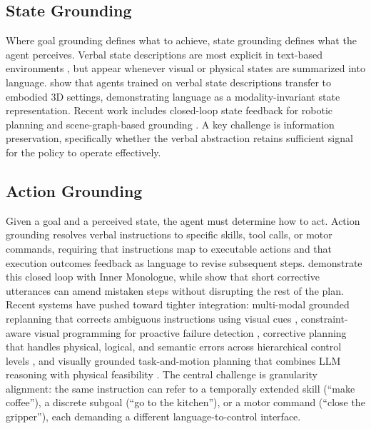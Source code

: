 \subsection{State Grounding}%
\label{sec:state-grounding}
Where goal grounding defines what to achieve, state grounding defines what the agent perceives. Verbal state descriptions are most explicit in text-based environments \citep{yao2020keep, cote2018textworld}, but appear whenever visual or physical states are summarized into language. \citet{shridhar2020alfworld} show that agents trained on verbal state descriptions transfer to embodied 3D settings, demonstrating language as a modality-invariant state representation. Recent work includes closed-loop state feedback for robotic planning \citep{bhat2024grounding} and scene-graph-based grounding \citep{huang2025escacontextualizingembodiedagents}. A key challenge is information preservation, specifically whether the verbal abstraction retains sufficient signal for the policy to operate effectively.



\subsection{Action Grounding}%
\label{sec:action-grounding}
Given a goal and a perceived state, the agent must determine how to act. Action grounding resolves verbal instructions to specific skills, tool calls, or motor commands, requiring that instructions map to executable actions and that execution outcomes feedback as language to revise subsequent steps. \citet{huang2022inner} demonstrate this closed loop with Inner Monologue, while \citet{sharma2022correcting} show that short corrective utterances can amend mistaken steps without disrupting the rest of the plan. Recent systems have pushed toward tighter integration: multi-modal grounded replanning that corrects ambiguous instructions using visual cues \citep{kim2025multi}, constraint-aware visual programming for proactive failure detection \citep{zhou2025code}, corrective planning that handles physical, logical, and semantic errors across hierarchical control levels \citep{joublin2024copal}, and visually grounded task-and-motion planning that combines LLM reasoning with physical feasibility \citep{zhang2025llm}. The central challenge is granularity alignment: the same instruction can refer to a temporally extended skill (``make coffee''), a discrete subgoal (``go to the kitchen''), or a motor command (``close the gripper''), each demanding a different language-to-control interface.



